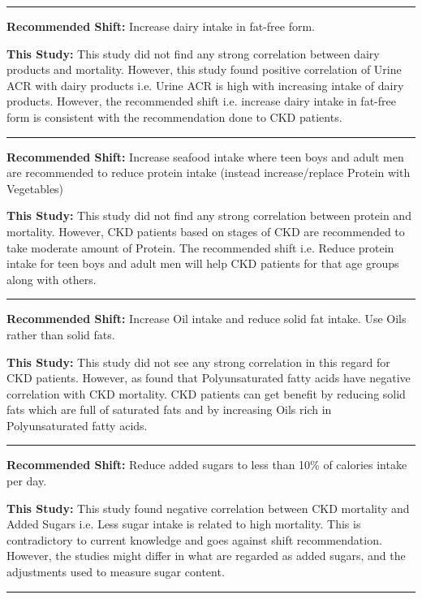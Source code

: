 \noindent\rule{9cm}{0.4pt}

\noindent \textbf{Recommended Shift:} Increase dairy intake in fat-free form.

\noindent \textbf{This Study:}  This study did not find any strong correlation between dairy products and mortality. However, this study found positive correlation of Urine ACR with dairy products i.e. Urine ACR is high with increasing intake of  dairy products. However, the recommended shift i.e. increase dairy intake in fat-free form is consistent with the recommendation done to CKD patients.

\noindent\rule{9cm}{0.4pt}

\noindent \textbf{Recommended Shift:} Increase seafood intake where teen boys and adult men are recommended to reduce protein intake (instead increase/replace Protein with Vegetables)

\noindent \textbf{This Study:} This study did not find any strong correlation between protein and mortality. However, CKD patients based on stages of CKD are recommended to take moderate amount of Protein. The recommended shift i.e. Reduce protein intake for teen boys and adult men will help CKD patients for that age groups along with others. 

\noindent\rule{9cm}{0.4pt}

\noindent \textbf{Recommended Shift:} Increase Oil intake and reduce solid fat intake. Use Oils rather than solid fats.

\noindent \textbf{This Study:} This study did not see any strong correlation in this regard for CKD patients. However, as found that Polyunsaturated fatty acids have negative correlation with CKD mortality. CKD patients can get benefit by reducing solid fats which are full of saturated fats \cite{Choosemyplate2015} and by increasing Oils rich in Polyunsaturated fatty acids. 

\noindent\rule{9cm}{0.4pt}

\noindent \textbf{Recommended Shift:} Reduce added sugars to less than 10\% of calories intake per day. 

\noindent \textbf{This Study:} This study found negative correlation between CKD mortality and Added Sugars i.e. Less sugar intake is related to high mortality. This is contradictory to current knowledge and goes against shift recommendation. However, the studies might differ in what are regarded as added sugars, and the adjustments used to measure sugar content.

\noindent\rule{9cm}{0.4pt}


